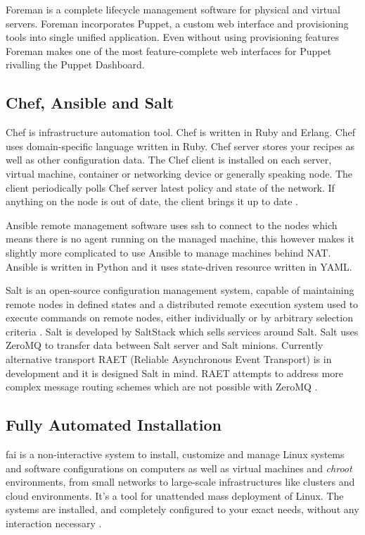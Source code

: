 \documentclass[a4paper,11pt]{kth-mag}
\begin{document}
Foreman is a complete lifecycle management software for physical and virtual
servers. Foreman incorporates Puppet, a custom web interface and provisioning
tools into single unified application. Even without using provisioning features
Foreman makes one of the most feature-complete web interfaces for Puppet
rivalling the Puppet Dashboard.

\subsection{Chef, Ansible and Salt}

Chef is infrastructure automation tool. Chef is written in Ruby and Erlang.
Chef uses domain-specific language written in Ruby.
Chef server stores your recipes as well as other configuration data.
The Chef client is installed on each server, virtual machine, container
or networking device or generally speaking node.
The client periodically polls Chef server latest policy and
state of the network. If anything on the node is out of date,
the client brings it up to date \cite{linuxmag-7841}.

Ansible remote management software uses \acrfull{ssh} to connect to the nodes which
means there is no agent running on the managed machine, this however makes
it slightly more complicated to use Ansible to manage machines behind NAT.
Ansible is written in Python and it uses state-driven resource
written in YAML.

Salt is an open-source configuration management system,
capable of maintaining remote nodes in defined states and
a distributed remote execution system used to execute commands
on remote nodes, either individually or by arbitrary selection criteria
\cite{salt}.
Salt is developed by SaltStack which sells services around Salt.
Salt uses ZeroMQ to transfer data between Salt server and
Salt minions.
Currently alternative transport
RAET (Reliable Asynchronous Event Transport)
is in development and it is designed Salt in mind.
RAET attempts to address more complex message routing
schemes which are not possible with ZeroMQ \cite{raet}.


\subsection{Fully Automated Installation}

\acrfull{fai} is a non-interactive system to install, customize and manage
Linux systems and software configurations on computers as well as
virtual machines and \emph{chroot} environments, from small networks to
large-scale infrastructures like clusters and cloud environments.
It's a tool for unattended mass deployment of Linux. The systems
are installed, and completely configured to your exact needs,
without any interaction necessary \cite{fai}.
\end{document}
